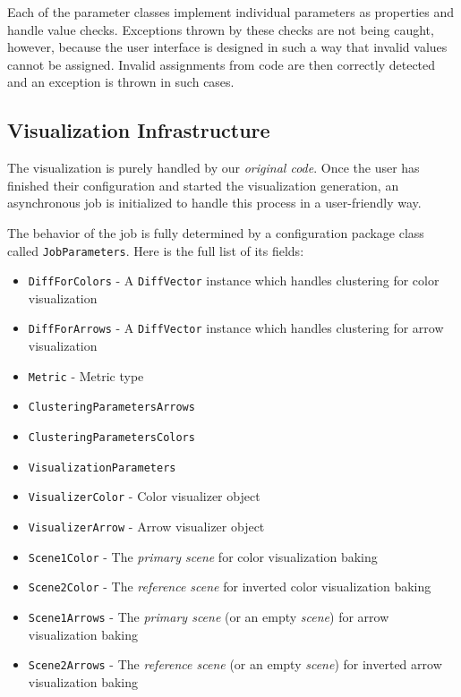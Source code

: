Each of the parameter classes implement individual parameters as properties and handle value checks. Exceptions thrown by these checks are not being caught, however, because the user interface is designed in such a way that invalid values cannot be assigned. Invalid assignments from code are then correctly detected and an exception is thrown in such cases.
\subsection{Visualization Infrastructure}

The visualization is purely handled by our {\it original code}. Once the user has finished their configuration and started the visualization generation, an asynchronous job is initialized to handle this process in a user-friendly way.

The behavior of the job is fully determined by a configuration package class called \verb+JobParameters+. Here is the full list of its fields:

\begin{itemize}
\item \verb+DiffForColors+ - A \verb+DiffVector+ instance which handles clustering for color visualization
\item \verb+DiffForArrows+ - A \verb+DiffVector+ instance which handles clustering for arrow visualization
\item \verb+Metric+ - Metric type
\item \verb+ClusteringParametersArrows+
\item \verb+ClusteringParametersColors+
\item \verb+VisualizationParameters+
\item \verb+VisualizerColor+ - Color visualizer object
\item \verb+VisualizerArrow+ - Arrow visualizer object
\item \verb+Scene1Color+ - The {\it primary scene} for color visualization baking
\item \verb+Scene2Color+ - The {\it reference scene} for inverted color visualization baking
\item \verb+Scene1Arrows+ - The {\it primary scene} (or an empty {\it scene}) for arrow visualization baking
\item \verb+Scene2Arrows+ - The {\it reference scene} (or an empty {\it scene}) for inverted arrow visualization baking
\end{itemize}

